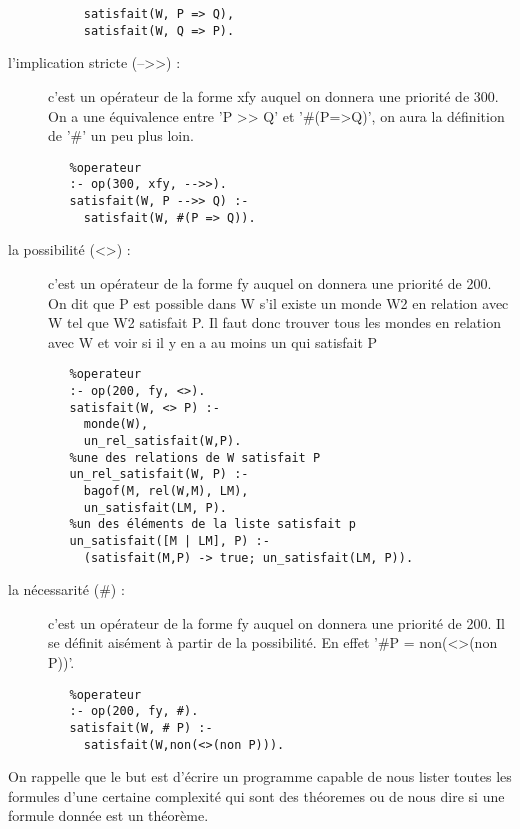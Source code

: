 \documentclass[a4paper,10pt]{article}
\begin{document}
\begin{description}
\begin{lstlisting}
     satisfait(W, P => Q),
     satisfait(W, Q => P).
       \end{lstlisting}
    \item[l'implication stricte (-->>) :] c'est un op\'{e}rateur de la forme xfy auquel on donnera une priorit\'{e} de 300. On a une \'{e}quivalence entre
    'P \-\->> Q' et '\#(P=>Q)', on aura la d\'{e}finition de '\#' un peu plus loin.
       \begin{lstlisting}
   %operateur
   :- op(300, xfy, -->>).
   satisfait(W, P -->> Q) :-
     satisfait(W, #(P => Q)).
       \end{lstlisting}
    \item[la possibilit\'{e} (<>) :] c'est un op\'{e}rateur de la forme fy auquel on donnera une priorit\'{e} de 200. On dit que P est possible dans W s'il existe
    un monde W2 en relation avec W tel que W2 satisfait P. Il faut donc trouver tous les mondes en relation avec W et voir si il y en a au moins un qui satisfait P
       \begin{lstlisting}
   %operateur
   :- op(200, fy, <>).
   satisfait(W, <> P) :-
     monde(W),
     un_rel_satisfait(W,P).
   %une des relations de W satisfait P
   un_rel_satisfait(W, P) :-
     bagof(M, rel(W,M), LM),
     un_satisfait(LM, P).
   %un des éléments de la liste satisfait p
   un_satisfait([M | LM], P) :-
     (satisfait(M,P) -> true; un_satisfait(LM, P)).
       \end{lstlisting}
    \item[la n\'{e}cessarit\'{e} (\#) :] c'est un op\'{e}rateur de la forme fy auquel on donnera une priorit\'{e} de 200. Il se d\'{e}finit ais\'{e}ment \`{a} partir
    de la possibilit\'{e}. En effet '\#P = non(<>(non P))'.
       \begin{lstlisting}
   %operateur
   :- op(200, fy, #).
   satisfait(W, # P) :-
     satisfait(W,non(<>(non P))).
       \end{lstlisting}
   \end{description}
   
   On rappelle que le but est d'\'{e}crire un programme capable de nous lister toutes les formules d'une certaine complexit\'{e} qui sont des th\'{e}oremes ou de nous
   dire si une formule donn\'{e}e est un th\'{e}or\`{e}me.
   
\end{document}
